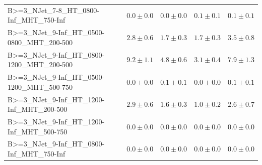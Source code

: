\documentclass{beamer}
\begin{document}
\begin{frame}
\begin{tabular}{lrrrr}
      B>=3\_NJet\_7-8\_HT\_0800-Inf\_MHT\_750-Inf &               $0.0\pm0.0$&              $0.0\pm0.0$&              $0.1\pm0.1$&                   $0.1\pm0.1$ \\
   B>=3\_NJet\_9-Inf\_HT\_0500-0800\_MHT\_200-500 &               $2.8\pm0.6$&              $1.7\pm0.3$&              $1.7\pm0.3$&                   $3.5\pm0.8$ \\
   B>=3\_NJet\_9-Inf\_HT\_0800-1200\_MHT\_200-500 &               $9.2\pm1.1$&              $4.8\pm0.6$&              $3.1\pm0.4$&                   $7.9\pm1.3$ \\
   B>=3\_NJet\_9-Inf\_HT\_0500-1200\_MHT\_500-750 &               $0.0\pm0.0$&              $0.1\pm0.1$&              $0.0\pm0.0$&                   $0.1\pm0.1$ \\
    B>=3\_NJet\_9-Inf\_HT\_1200-Inf\_MHT\_200-500 &               $2.9\pm0.6$&              $1.6\pm0.3$&              $1.0\pm0.2$&                   $2.6\pm0.7$ \\
    B>=3\_NJet\_9-Inf\_HT\_1200-Inf\_MHT\_500-750 &               $0.0\pm0.0$&              $0.0\pm0.0$&              $0.0\pm0.0$&                   $0.0\pm0.0$ \\
    B>=3\_NJet\_9-Inf\_HT\_0800-Inf\_MHT\_750-Inf &               $0.0\pm0.0$&              $0.0\pm0.0$&              $0.0\pm0.0$&                   $0.0\pm0.0$ \\
\bottomrule
\end{tabular}
\end{frame}
\end{document}
